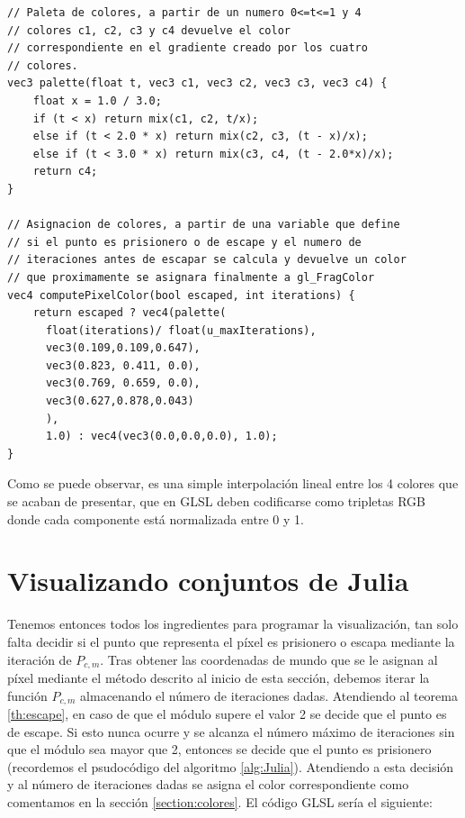 \begin{lstlisting}
// Paleta de colores, a partir de un numero 0<=t<=1 y 4 
// colores c1, c2, c3 y c4 devuelve el color 
// correspondiente en el gradiente creado por los cuatro 
// colores.
vec3 palette(float t, vec3 c1, vec3 c2, vec3 c3, vec3 c4) {
    float x = 1.0 / 3.0;
    if (t < x) return mix(c1, c2, t/x);
    else if (t < 2.0 * x) return mix(c2, c3, (t - x)/x);
    else if (t < 3.0 * x) return mix(c3, c4, (t - 2.0*x)/x);
    return c4;
}

// Asignacion de colores, a partir de una variable que define
// si el punto es prisionero o de escape y el numero de 
// iteraciones antes de escapar se calcula y devuelve un color 
// que proximamente se asignara finalmente a gl_FragColor
vec4 computePixelColor(bool escaped, int iterations) {
    return escaped ? vec4(palette(
      float(iterations)/ float(u_maxIterations),
      vec3(0.109,0.109,0.647), 
      vec3(0.823, 0.411, 0.0), 
      vec3(0.769, 0.659, 0.0), 
      vec3(0.627,0.878,0.043)
      ), 
      1.0) : vec4(vec3(0.0,0.0,0.0), 1.0);
}
\end{lstlisting}

Como se puede observar, es una simple interpolación lineal entre los 4 colores que se acaban de presentar, que en GLSL deben codificarse como tripletas RGB donde cada componente está normalizada entre 0 y 1.

\section{Visualizando conjuntos de Julia}
\label{section:grafica-julia}

Tenemos entonces todos los ingredientes para programar la visualización, tan solo falta decidir si el punto que representa el píxel es prisionero o escapa mediante la iteración de $P_{c,m}$. Tras obtener las coordenadas de mundo que se le asignan al píxel mediante el método descrito al inicio de esta sección, debemos iterar la función $P_{c,m}$ almacenando el número de iteraciones dadas. Atendiendo al teorema \ref{th:escape}, en caso de que el módulo supere el valor 2 se decide que el punto es de escape. Si esto nunca ocurre y se alcanza el número máximo de iteraciones sin que el módulo sea mayor que 2, entonces se decide que el punto es prisionero (recordemos el psudocódigo del algoritmo \ref{alg:Julia}). Atendiendo a esta decisión y al número de iteraciones dadas se asigna el color correspondiente como comentamos en la sección \ref{section:colores}. El código GLSL sería el siguiente:

